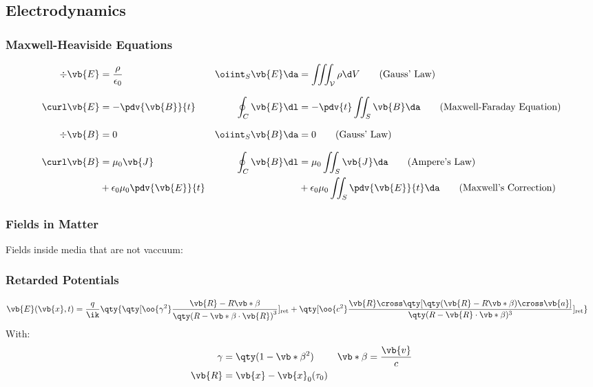 \subsection{Electrodynamics}
\subsubsection{Maxwell-Heaviside Equations}
\begin{align*}
	\div\vb{E}&=\frac{\rho}{\epsilon_0}
	&
	\oiint_{S}\vb{E}\da&=\iiint_{\mathcal{V}}\rho\d V\tag{Gauss' Law}
	\\[0.25cm]
	\curl\vb{E}&=-\pdv{\vb{B}}{t}
	&
	\oint_{C}\vb{E}\dl&=-\pdv{t}\iint_{S}\vb{B}\da\tag{Maxwell-Faraday Equation}
	\\[0.25cm]
	\div\vb{B}&=0
	&
	\oiint_{S}\vb{B}\da&=0\tag{Gauss' Law}
	\\[0.25cm]
	\curl\vb{B}&=\mu_0\vb{J}
	&
	\oint_{C}\vb{B}\dl&=\mu_0\iint_{S}\vb{J}\da\tag{Ampere's Law}
	\\
	&+\epsilon_0\mu_0\pdv{\vb{E}}{t}&&+\epsilon_0\mu_0\iint_{S}\pdv{\vb{E}}{t}\da\tag{Maxwell's Correction}
\end{align*}
\subsubsection{Fields in Matter}
Fields inside media that are not vaccuum:
\subsubsection{Retarded Potentials}
\begin{align*}
	\vb{E}(\vb{x},t)&=\frac{q}{\ik}\qty{\qty[\oo{\gamma^2}\frac{\vb{R}-R\vb*{\beta}}{{\qty(R-\vb*{\beta}\cdot\vb{R})}^3}]_{\text{ret}}
	+\qty[\oo{c^2}\frac{\vb{R}\cross\qty[\qty(\vb{R}-R\vb*{\beta})\cross\vb{a}]}{\qty(R-\vb{R}\cdot\vb*{\beta})^3}]_{\text{ret}}}
\end{align*}
With:
\begin{align*}
	\gamma&=\qty(1-\vb*{\beta}^2)
	&
	\vb*{\beta}&=\frac{\vb{v}}{c}
	\\
	\vb{R}&=\vb{x}-\vb{x}_0(\tau_0)
\end{align*}
